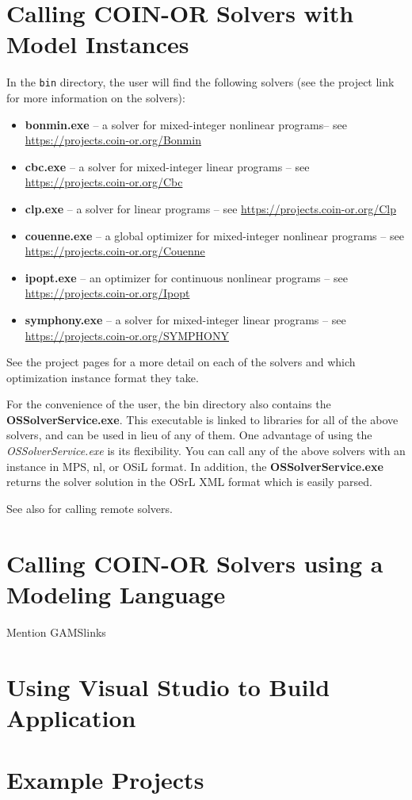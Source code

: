 \documentclass[11pt]{article}
\renewcommand{\_}{{\char"5F}}
\renewcommand{\{}{{\char"7B}}
\renewcommand{\}}{{\char"7D}}
\renewcommand{\^}{{\char"0D}}
\renewcommand{\'}{{\char"0D}}
\begin{document}
\section{Calling COIN-OR Solvers with Model Instances}

In the {\tt bin} directory, the user will find the following solvers (see the project link for more information on the solvers):
\begin{itemize}
\item {\bf bonmin.exe} -- a solver for mixed-integer nonlinear programs-- see \url{https://projects.coin-or.org/Bonmin}

\item {\bf cbc.exe} --  a solver for mixed-integer linear programs --  see \url{https://projects.coin-or.org/Cbc}

\item {\bf clp.exe} -- a solver for linear programs  -- see \url{https://projects.coin-or.org/Clp}

\item {\bf couenne.exe} -- a global optimizer for mixed-integer nonlinear programs  -- see \url{https://projects.coin-or.org/Couenne}

\item {\bf ipopt.exe} -- an optimizer for continuous nonlinear programs -- see \url{https://projects.coin-or.org/Ipopt}

\item {\bf symphony.exe} -- a solver for mixed-integer linear programs -- see \url{https://projects.coin-or.org/SYMPHONY}
\end{itemize}

See the project pages for a more detail on each of the solvers and which optimization instance format they take.

For the convenience of the user, the bin directory also contains the {\bf OSSolverService.exe}.  This executable is linked to libraries for all of the above solvers, and can be used in lieu of any of them. One advantage of using the {\it OSSolverService.exe}  is its flexibility. You can call any of the above solvers with an instance in MPS, nl, or OSiL format.   In addition, the {\bf OSSolverService.exe} returns the solver solution in the OSrL XML format which is easily parsed. 

See also for calling remote solvers. 

\section{Calling COIN-OR  Solvers using a Modeling Language}

Mention GAMSlinks

\section{Using Visual Studio to Build Application}

\section{Example Projects}
\end{document}
